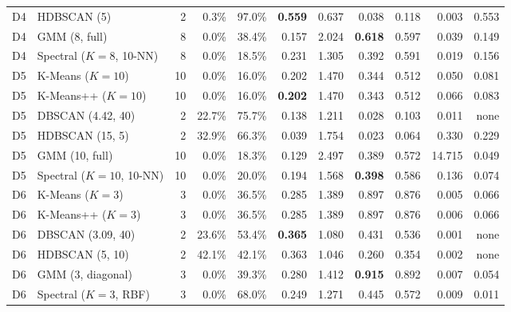 \begin{table}[h]
{\begin{tabular}{llrrrrrrrrr}
D4 & HDBSCAN (5) & 2 & 0.3\% & 97.0\% & \textbf{0.559} & 0.637 & 0.038 & 0.118 & 0.003 & 0.553 \\
D4 & GMM (8, full) & 8 & 0.0\% & 38.4\% & 0.157 & 2.024 & \textbf{0.618} & 0.597 & 0.039 & 0.149 \\
D4 & Spectral ($K=8$, 10-NN) & 8 & 0.0\% & 18.5\% & 0.231 & 1.305 & 0.392 & 0.591 & 0.019 & 0.156 \\
\midrule
D5 & K-Means ($K=10$) & 10 & 0.0\% & 16.0\% & 0.202 & 1.470 & 0.344 & 0.512 & 0.050 & 0.081 \\
D5 & K-Means++ ($K=10$) & 10 & 0.0\% & 16.0\% & \textbf{0.202} & 1.470 & 0.343 & 0.512 & 0.066 & 0.083 \\
D5 & DBSCAN (4.42, 40) & 2 & 22.7\% & 75.7\% & 0.138 & 1.211 & 0.028 & 0.103 & 0.011 & none \\
D5 & HDBSCAN (15, 5) & 2 & 32.9\% & 66.3\% & 0.039 & 1.754 & 0.023 & 0.064 & 0.330 & 0.229 \\
D5 & GMM (10, full) & 10 & 0.0\% & 18.3\% & 0.129 & 2.497 & 0.389 & 0.572 & 14.715 & 0.049 \\
D5 & Spectral ($K=10$, 10-NN) & 10 & 0.0\% & 20.0\% & 0.194 & 1.568 & \textbf{0.398} & 0.586 & 0.136 & 0.074 \\
\midrule
D6 & K-Means ($K=3$) & 3 & 0.0\% & 36.5\% & 0.285 & 1.389 & 0.897 & 0.876 & 0.005 & 0.066 \\
D6 & K-Means++ ($K=3$) & 3 & 0.0\% & 36.5\% & 0.285 & 1.389 & 0.897 & 0.876 & 0.006 & 0.066 \\
D6 & DBSCAN (3.09, 40) & 2 & 23.6\% & 53.4\% & \textbf{0.365} & 1.080 & 0.431 & 0.536 & 0.001 & none \\
D6 & HDBSCAN (5, 10) & 2 & 42.1\% & 42.1\% & 0.363 & 1.046 & 0.260 & 0.354 & 0.002 & none \\
D6 & GMM (3, diagonal) & 3 & 0.0\% & 39.3\% & 0.280 & 1.412 & \textbf{0.915} & 0.892 & 0.007 & 0.054 \\
D6 & Spectral ($K=3$, RBF) & 3 & 0.0\% & 68.0\% & 0.249 & 1.271 & 0.445 & 0.572 & 0.009 & 0.011 \\
\bottomrule
\end{tabular}}
\end{table}

